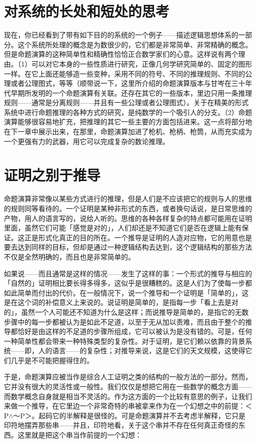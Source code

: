 \documentclass[
  12pt,
  twoside,
  openright,
  oldfontcommands,
]{memoir}
\begin{document}
\section{对系统的长处和短处的思考}

现在，你已经看到了带有如下目的的系统的一个例子------描述逻辑思想体系的一部分。这个系统所处理的概念是为数很少的，它们都是非常简单、非常精确的概念。但是命题演算的这种简单性和精确性恰恰正合数学家们的心意。这样说有两个理由。（1）可以对它本身的一些性质进行研究，正像几何学研究简单的、固定的图形一样。在它上面还能够造一些变种，采用不同的符号、不同的推理规则、不同的公理或者公理图式，等等（顺带说一下，这里所介绍的命题演算版本与甘岑在三十年代早期所发明的一个命题演算有关联。还存在其它的一些版本，里边只用一条推理规则------通常是分离规则------并且有一些公理或者公理图式）。关于在精美的形式系统中进行命题推理的各种方式的研究，是纯数学的一个吸引人的分支。（2）命题演算能够很容易地扩充，把推理的其它一些主要的方面包括进来。这一点将部分地在下一章中展示出来，在那里，命题演算加进了枪机、枪柄、枪筒，从而充实成为一个更强有力的武器，用它可以完成复杂的数论推理。

\section{证明之别于推导}

命题演算非常像以某些方式进行的推理，但是人们是不应该把它的规则与人的思维的规则同等看待的。一个证明是某种非形式的东西，或者换句话说，是日常思维的产物，用人的语言写的，说给人听的。思维的各种各样复杂的特点都可能用在证明里面，虽然它们可能「感觉是对的」，人们却还是不知道它们是否在逻辑上能有保证。这正是形式化真正的目的所在。一个推导是证明的人造对应物，它的用意也是要去达到同样的目标，但却是通过一种逻辑结构去达到，这个逻辑结构的那些方法不仅是全然明确的，而且也是非常简单的。

如果说------而且通常是这样的情况------发生了这样的事：一个形式的推导与相应的「自然的」证明相比要长得多得多，这似乎是很糟糕的。这是人们为了使每一步都如此简单而付出的代价。在一般情况下，说一个推导和一个证明是「简单的」，这是在这个词的补偿意义上来说的。说证明是简单的，是指每一步「看上去是对的」，虽然一个人可能还不知道为什么是这样；而说推导是简单的，是指它的无数步骤中的每一步都被认为是如此不足道，以至于无从加以责难，而且由于整个的推导都恰好是由这样的不足道的步骤所组成，它可以被认为是没有错的。可是，任何一种简单性都会带来一种特殊类型的复杂性。对于证明，是它们赖以依靠的背景系统------即，人的语言------的复杂性；对推导来说，这是它们的天文规模，这使得它们几乎是不可能把握得住的。

于是，命题演算应被当作是综合人工证明之类的结构的一般方法的一部分。然而，它并没有很大的灵活性或一般性。我们仅仅是想把它用在一些数学的概念方面------而数学概念自身就是相当不灵活的。作为这方面的一个比较有意思的例子，让我们来做一个推导，在它里边一个非常奇特的串被拿来作为在一个幻想之中的前提：＜P$\wedge$～P＞。起码它的半解释是很怪的。可是命题演算并不去考虑半解释，它只是印符地摆弄那些串------并且，印符地看，关于这个串并不存在任何真正奇怪的东西。这里就是把这个串当作前提的一个幻想：
\end{document}
